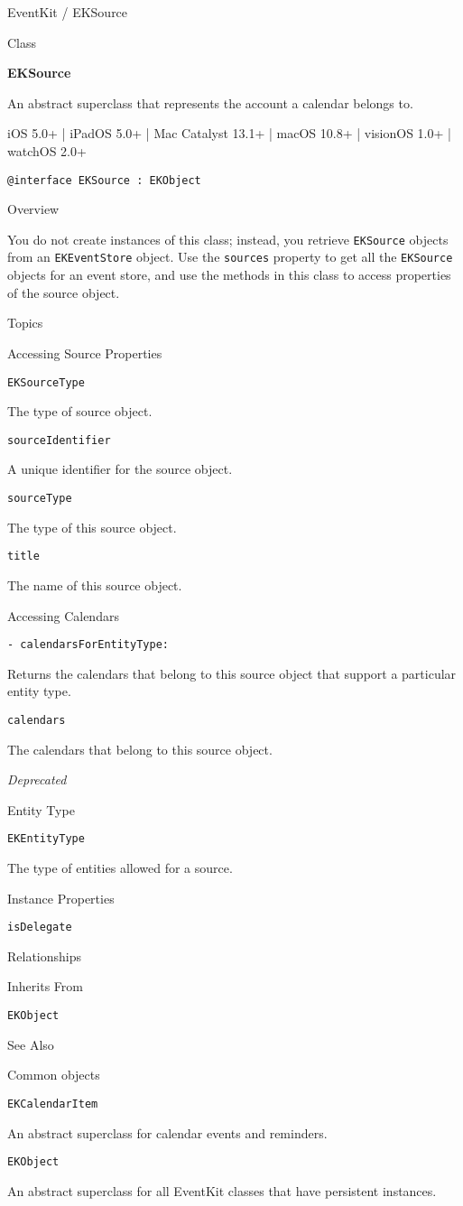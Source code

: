 \documentclass{article}
\title{}
\author{}
\date{}
\begin{document}
EventKit / EKSource

Class

\textbf{EKSource}

An abstract superclass that represents the account a calendar belongs to.

iOS 5.0+ | iPadOS 5.0+ | Mac Catalyst 13.1+ | macOS 10.8+ | visionOS 1.0+ | watchOS 2.0+

\texttt{@interface EKSource : EKObject}

Overview

You do not create instances of this class; instead, you retrieve \texttt{EKSource} objects from an \texttt{EKEventStore} object. Use the \texttt{sources} property to get all the \texttt{EKSource} objects for an event store, and use the methods in this class to access properties of the source object.

Topics

Accessing Source Properties

\texttt{EKSourceType}

The type of source object.

\texttt{sourceIdentifier}

A unique identifier for the source object.

\texttt{sourceType}

The type of this source object.

\texttt{title}

The name of this source object.

Accessing Calendars

\texttt{- calendarsForEntityType:}

Returns the calendars that belong to this source object that support a particular entity type.

\texttt{calendars}

The calendars that belong to this source object.

\textit{Deprecated}

Entity Type

\texttt{EKEntityType}

The type of entities allowed for a source.

Instance Properties

\texttt{isDelegate}

Relationships

Inherits From

\texttt{EKObject}

See Also

Common objects

\texttt{EKCalendarItem}

An abstract superclass for calendar events and reminders.

\texttt{EKObject}

An abstract superclass for all EventKit classes that have persistent instances.

\newpage
\end{document}
